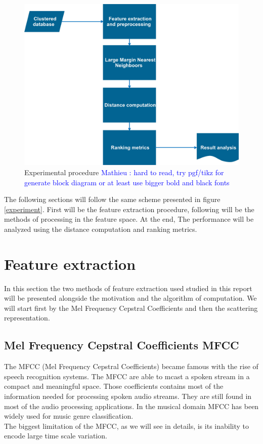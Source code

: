 \documentclass[hidelinks,12pt]{report}
\newcommand{\ml}[1]{\textcolor{blue}{ Mathieu : #1}}
\begin{document}
\begin{figure}[t!]
  
  \centering
	    \includegraphics[width=1\textwidth]{experimental_procedure}
    \caption{Experimental procedure \ml{hard to read, try pgf/tikz for generate block diagram or at least use bigger bold and black fonts} }
    \label{expermient}
\end{figure}
The following sections will follow the same scheme presented in figure \ref{experiment}. First will be the feature extraction procedure, following will be the methods of processing in the feature space. At the end, The performance will be analyzed using the distance computation and ranking metrics.

\section{Feature extraction}
In this section the two methods of feature extraction used studied in this report will be presented alongside the motivation and the algorithm of computation. We will start first by the Mel Frequency Cepstral Coefficients and then the scattering representation. 
\subsection{Mel Frequency Cepstral Coefficients MFCC}
The MFCC (Mel Frequency Cepstral Coefficients)  became famous with the rise of speech recognition systems. The MFCC are able to mcast a spoken stream in a compact and meaningful space. Those coefficients contains most of the information needed for processing spoken audio streams. They are still found in most of the audio processing applications. In the musical domain MFCC has been widely used for music genre classification.\\ The biggest limitation of the MFCC, as we will see in details, is its inability to encode large time scale variation.
\end{document}
